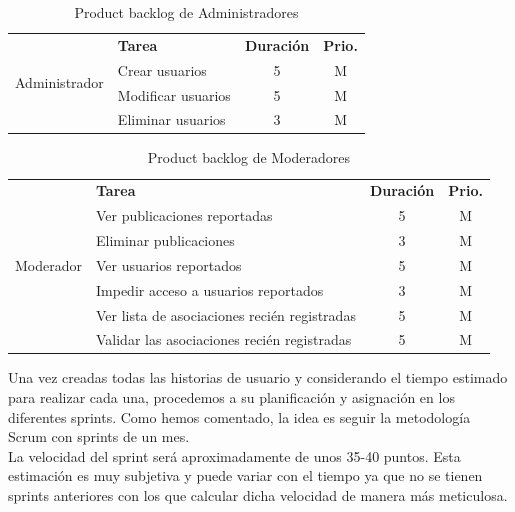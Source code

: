 \begin{table}[H]
	\centering
	\begin{tabular}{|c|p{8cm}|c|c|} \hline 
		\multirow[c]{4}{*}{Administrador}&  \textbf{Tarea}&  \textbf{Duración}& \textbf{Prio.}\\  \cline{2-4}
		&  Crear usuarios &  5& M\\ \cline{2-4}
		&  Modificar usuarios &  5& M\\ \cline{2-4}
		&  Eliminar usuarios &  3& M\\ \hline
		
		
		
	\end{tabular}
	\caption{Product backlog de Administradores}
	\label{tab:pb_administradores}
\end{table}

\begin{table}[H]
	\centering
	\begin{tabular}{|c|p{8cm}|c|c|} \hline 
		\multirow[c]{7}{*}{Moderador}&  \textbf{Tarea}&  \textbf{Duración}& \textbf{Prio.}\\  \cline{2-4}
		&  Ver publicaciones reportadas &  5& M\\ \cline{2-4}
		&  Eliminar publicaciones &  3& M\\ \cline{2-4}
		
		&  Ver usuarios reportados &  5& M\\ \cline{2-4}
		&  Impedir acceso a usuarios reportados &  3& M\\ \cline{2-4}
		
		&  Ver lista de asociaciones recién registradas &  5& M\\ \cline{2-4}
		&  Validar las asociaciones recién registradas& 5 & M\\ \hline
		
		
		
	\end{tabular}
	\caption{Product backlog de Moderadores}
	\label{tab:pb_moderadores}
\end{table}

Una vez creadas todas las historias de usuario y considerando el tiempo estimado para realizar cada una, procedemos a su planificación y asignación en los diferentes sprints. Como hemos comentado, la idea es seguir la metodología Scrum con sprints de un mes.  \\

La  velocidad del sprint será aproximadamente de unos 35-40 puntos. Esta estimación es muy subjetiva y puede variar con el tiempo ya que no se tienen sprints anteriores con los que calcular dicha velocidad de manera más meticulosa.


